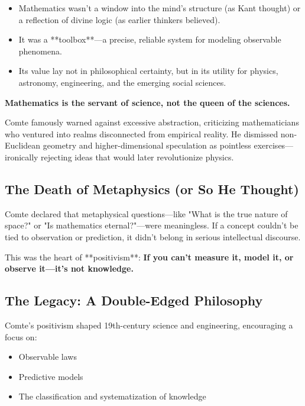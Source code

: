 \begin{itemize}
    \item Mathematics wasn’t a window into the mind’s structure (as Kant thought) or a reflection of divine logic (as earlier thinkers believed).
    \item It was a **toolbox**—a precise, reliable system for modeling observable phenomena.
    \item Its value lay not in philosophical certainty, but in its utility for physics, astronomy, engineering, and the emerging social sciences.
\end{itemize}

\begin{tcolorbox}[colback=gray!5!white, colframe=black!75!white, title={Comte’s View of Mathematics}]
\textbf{Mathematics is the servant of science,  
not the queen of the sciences.}
\end{tcolorbox}

Comte famously warned against excessive abstraction, criticizing mathematicians who ventured into realms disconnected from empirical reality. He dismissed non-Euclidean geometry and higher-dimensional speculation as pointless exercises—ironically rejecting ideas that would later revolutionize physics.

\subsection*{The Death of Metaphysics (or So He Thought)}

Comte declared that metaphysical questions—like "What is the true nature of space?" or "Is mathematics eternal?"—were meaningless. If a concept couldn’t be tied to observation or prediction, it didn’t belong in serious intellectual discourse.

This was the heart of **positivism**:  
\textbf{If you can’t measure it, model it, or observe it—it’s not knowledge.}

\subsection*{The Legacy: A Double-Edged Philosophy}

Comte’s positivism shaped 19th-century science and engineering, encouraging a focus on:

\begin{itemize}
    \item Observable laws
    \item Predictive models
    \item The classification and systematization of knowledge
\end{itemize}

